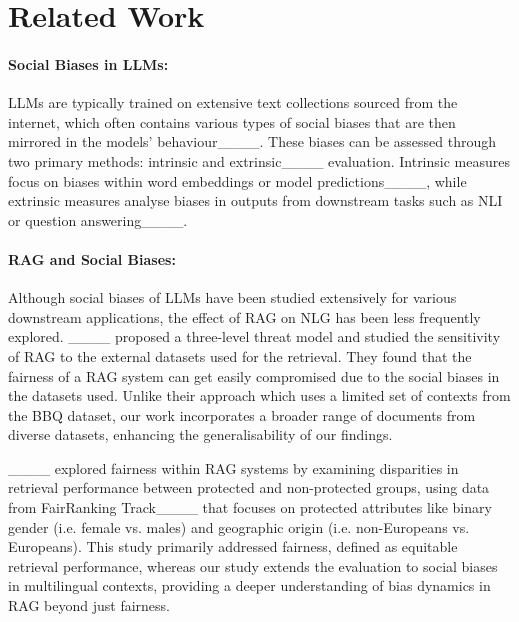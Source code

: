 \section{Related Work}
\label{sec:related}


\paragraph{Social Biases in LLMs:}
\acp{LLM} are typically trained on extensive text collections sourced from the internet, which often contains various types of social biases that are then mirrored in the models' behaviour____. 
These biases can be assessed through two primary methods: intrinsic and extrinsic____ evaluation.
Intrinsic measures focus on biases within word embeddings or model predictions____, while extrinsic measures analyse biases in outputs from downstream tasks such as \ac{NLI} or question answering____.

\paragraph{RAG and Social Biases:}
Although social biases of \acp{LLM} have been studied extensively for various downstream applications, the effect of \ac{RAG} on \ac{NLG} has been less frequently explored.
____ proposed a three-level threat model and studied the sensitivity of \ac{RAG} to the external datasets used for the retrieval.
They found  that the fairness of a \ac{RAG} system can get easily compromised due to the social biases in the datasets used.
Unlike their approach which uses a limited set of contexts from the \ac{BBQ} dataset, our work incorporates a broader range of documents from diverse datasets, enhancing the generalisability of our findings.

____ explored fairness within \ac{RAG} systems by examining disparities in retrieval performance between protected and non-protected groups, using data from FairRanking Track____ that focuses on protected attributes like binary gender (i.e. female vs. males) and geographic origin (i.e. non-Europeans vs. Europeans).
This study primarily addressed fairness, defined as equitable retrieval performance, whereas our study extends the evaluation to social biases in multilingual contexts, providing a deeper understanding of bias dynamics in \ac{RAG} beyond just fairness.

